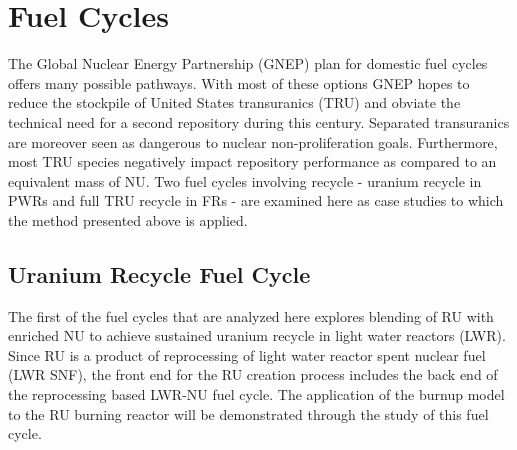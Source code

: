 \section{Fuel Cycles}
\label{1g_sec:fc}
The Global Nuclear Energy Partnership (GNEP) plan for domestic fuel cycles offers many possible 
pathways.  With most of these options GNEP hopes to reduce the stockpile of United States 
transuranics (TRU) and obviate the technical need for a second repository during this century.  
Separated transuranics are moreover seen as dangerous to nuclear non-proliferation goals.  
Furthermore, most TRU species negatively impact repository performance as compared to an equivalent 
mass of NU.  Two fuel cycles involving recycle - uranium recycle in PWRs and full TRU recycle in 
FRs - are examined here as case studies to which the method presented above is applied. 


\subsection{Uranium Recycle Fuel Cycle}
\label{1g_sec:UFC}
The first of the fuel cycles that are analyzed here explores blending of RU with enriched NU to 
achieve sustained uranium recycle in light water reactors (LWR).  Since RU is a product of 
reprocessing of light water reactor spent nuclear fuel (LWR SNF), the front end for the RU creation 
process includes the back end of the reprocessing based LWR-NU fuel cycle.  The application of the 
burnup model to the RU burning reactor will be demonstrated through the study of this fuel cycle.

